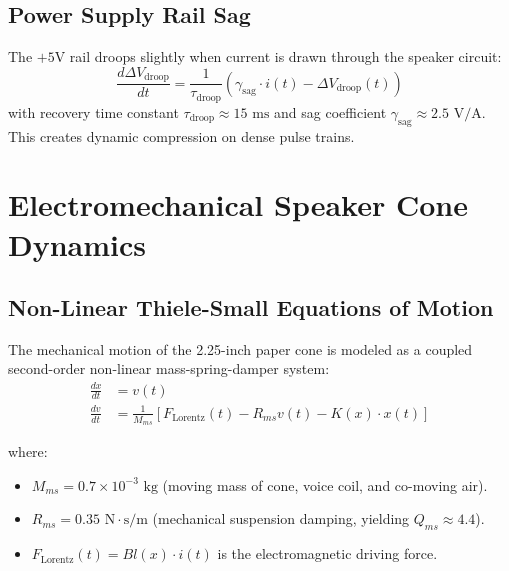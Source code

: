 \documentclass[11pt,a4paper]{article}
\begin{document}
\subsection{Power Supply Rail Sag}
The $+5\text{V}$ rail droops slightly when current is drawn through the speaker circuit:
\begin{equation}
\frac{d\Delta V_{\text{droop}}}{dt} = \frac{1}{\tau_{\text{droop}}} \left( \gamma_{\text{sag}} \cdot i(t) - \Delta V_{\text{droop}}(t) \right)
\end{equation}
with recovery time constant $\tau_{\text{droop}} \approx 15\text{ ms}$ and sag coefficient $\gamma_{\text{sag}} \approx 2.5\text{ V/A}$. This creates dynamic compression on dense pulse trains.

\section{Electromechanical Speaker Cone Dynamics}

\subsection{Non-Linear Thiele-Small Equations of Motion}
The mechanical motion of the 2.25-inch paper cone is modeled as a coupled second-order non-linear mass-spring-damper system:
\begin{align}
\frac{dx}{dt} &= v(t) \\
\frac{dv}{dt} &= \frac{1}{M_{ms}} \left[ F_{\text{Lorentz}}(t) - R_{ms} v(t) - K(x) \cdot x(t) \right]
\end{align}

where:
\begin{itemize}
    \item $M_{ms} = 0.7 \times 10^{-3}\text{ kg}$ (moving mass of cone, voice coil, and co-moving air).
    \item $R_{ms} = 0.35\text{ N}\cdot\text{s/m}$ (mechanical suspension damping, yielding $Q_{ms} \approx 4.4$).
    \item $F_{\text{Lorentz}}(t) = Bl(x) \cdot i(t)$ is the electromagnetic driving force.
\end{itemize}
\end{document}

